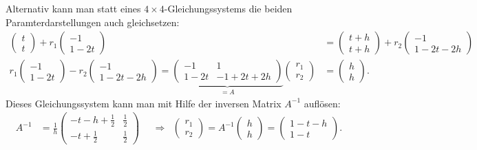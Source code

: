 \begin{loesung}
Alternativ kann man statt eines $4\times 4$-Gleichungssystems die beiden
Paramterdarstellungen auch gleichsetzen:
\begin{align*}
\begin{pmatrix}t\\t\end{pmatrix}
+r_1\begin{pmatrix}-1\\1-2t\end{pmatrix}
&=
\begin{pmatrix}t+h\\t+h\end{pmatrix}
+r_2\begin{pmatrix}-1\\1-2t-2h\end{pmatrix}
\\
r_1\begin{pmatrix}-1\\1-2t\end{pmatrix}
-r_2\begin{pmatrix}-1\\1-2t-2h\end{pmatrix}
=
\underbrace{
\begin{pmatrix}
-1&1\\
1-2t&-1+2t+2h
\end{pmatrix}
}_{\displaystyle=A}
\begin{pmatrix}r_1\\r_2 \end{pmatrix}
&=
\begin{pmatrix}h\\h\end{pmatrix}.
\end{align*}
Dieses Gleichungssystem kann man mit Hilfe der inversen Matrix $A^{-1}$
auflösen:
\begin{align*}
A^{-1}
&=
\frac1h
\begin{pmatrix}
-t-h+\frac12 & \frac12 \\
-t+\frac12 & \frac12
\end{pmatrix}
&&\Rightarrow&
\begin{pmatrix}r_1\\r_2\end{pmatrix}
=
A^{-1}\begin{pmatrix}h\\h\end{pmatrix}
=
\begin{pmatrix}
1-t-h\\
1-t
\end{pmatrix}.
\end{align*}

\end{loesung}
